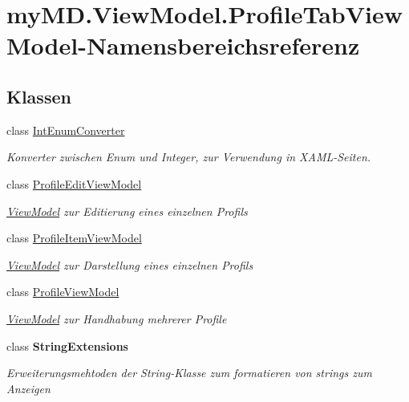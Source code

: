 \hypertarget{namespacemy_m_d_1_1_view_model_1_1_profile_tab_view_model}{}\section{my\+M\+D.\+View\+Model.\+Profile\+Tab\+View\+Model-\/\+Namensbereichsreferenz}
\label{namespacemy_m_d_1_1_view_model_1_1_profile_tab_view_model}
\subsection*{Klassen}
\begin{DoxyCompactItemize}
\item 
class \mbox{\hyperlink{classmy_m_d_1_1_view_model_1_1_profile_tab_view_model_1_1_int_enum_converter}{Int\+Enum\+Converter}}
\begin{DoxyCompactList}\small\item\em Konverter zwischen Enum und Integer, zur Verwendung in X\+A\+M\+L-\/\+Seiten. \end{DoxyCompactList}\item 
class \mbox{\hyperlink{classmy_m_d_1_1_view_model_1_1_profile_tab_view_model_1_1_profile_edit_view_model}{Profile\+Edit\+View\+Model}}
\begin{DoxyCompactList}\small\item\em \mbox{\hyperlink{namespacemy_m_d_1_1_view_model}{View\+Model}} zur Editierung eines einzelnen Profils \end{DoxyCompactList}\item 
class \mbox{\hyperlink{classmy_m_d_1_1_view_model_1_1_profile_tab_view_model_1_1_profile_item_view_model}{Profile\+Item\+View\+Model}}
\begin{DoxyCompactList}\small\item\em \mbox{\hyperlink{namespacemy_m_d_1_1_view_model}{View\+Model}} zur Darstellung eines einzelnen Profils \end{DoxyCompactList}\item 
class \mbox{\hyperlink{classmy_m_d_1_1_view_model_1_1_profile_tab_view_model_1_1_profile_view_model}{Profile\+View\+Model}}
\begin{DoxyCompactList}\small\item\em \mbox{\hyperlink{namespacemy_m_d_1_1_view_model}{View\+Model}} zur Handhabung mehrerer Profile \end{DoxyCompactList}\item 
class {\bfseries String\+Extensions}
\begin{DoxyCompactList}\small\item\em Erweiterungsmehtoden der String-\/\+Klasse zum formatieren von strings zum Anzeigen \end{DoxyCompactList}\end{DoxyCompactItemize}
